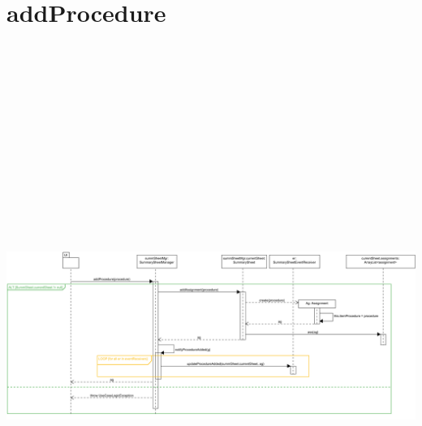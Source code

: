 \section{addProcedure}
\centering\includegraphics[max width=\textwidth, max height=190mm]{../resources/img/GCC/DSD/op2.png}

